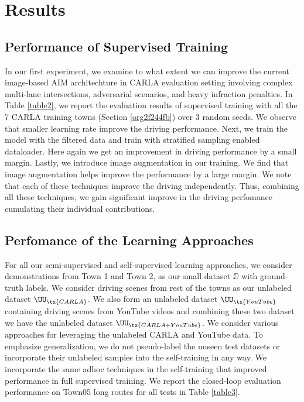 \documentclass[letterpaper, 12pt]{book}
\theoremstyle{definition}
\theoremstyle{definition}
\theoremstyle{definition}
\theoremstyle{definition}
\theoremstyle{definition}
\begin{document}
\section{Results}
\label{sec:orga7a305d}

\subsection{Performance of Supervised Training}
\label{sec:orge7e5ccf}



In our first experiment, we examine to what extent we can improve the current
image-based AIM architechture \cite{Prakash2021} in CARLA evaluation setting
involving complex multi-lane intersections, adversarial scenarios, and heavy
infraction penalties. In Table \ref{table2}, we report the evaluation results of
supervised training with all the 7 CARLA training towns (Section \ref{org2f244fb}) over 3
random seeds. We observe that smaller learning rate improve the driving
performance. Next, we train the model with the filtered data and train with
stratified sampling enabled dataloader. Here again we get an improvement in
driving performance by a small margin. Lastly, we introduce image augmentation
in our training. We find that image augmentation helps improve the performance
by a large margin. We note that each of these techniques improve the driving
independently. Thus, combining all these techniques, we gain significant improve
in the driving perfomance cumulating their individual contributions.

\subsection{Perfomance of the Learning Approaches}
\label{sec:org787dffc}
For all our semi-supervised and self-supervised learning approaches, we consider
demonstrations from Town 1 and Town 2, as our small dataset \(\DD\) with
ground-truth labels. We consider driving scenes from rest of the towns as our
unlabeled dataset \(\UU_{\tx{CARLA}}\). We also form an unlabeled dataset
\(\UU_{\tx{YouTube}}\) containing driving scenes from YouTube videos and
combining these two dataset we have the unlabeled dataset \(\UU_{\tx{CARLA +
YouTube}}\). We consider various approaches for leveraging the unlabeled CARLA
and YouTube data. To emphasize generalization, we do not pseudo-label the unseen
test datasets or incorporate their unlabeled samples into the self-training in
any way. We incorporate the same adhoc techniques in the self-training that
improved performance in full supervised training. We report the closed-loop
evaluation performance on Town05 long routes for all tests in Table
\ref{table3}.

\end{document}
